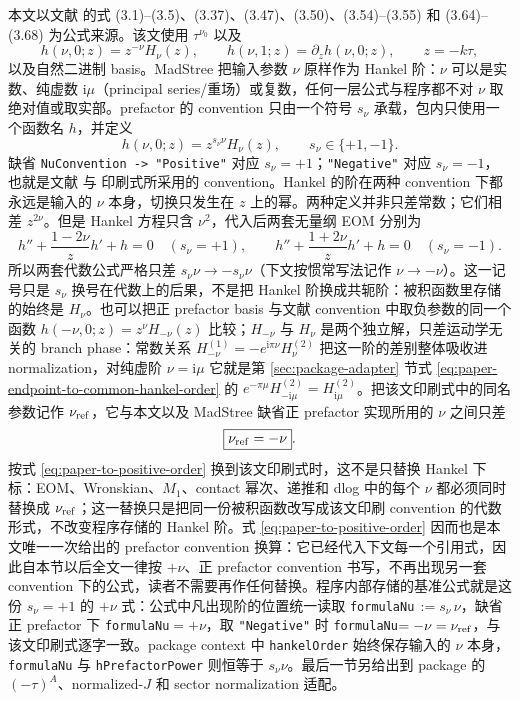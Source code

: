 \documentclass[11pt,a4paper]{ctexart}
\newcommand{\ii}{\mathrm i}
\begin{document}
本文以文献 \cite{Chen:2023eic} 的式 (3.1)--(3.5)、(3.37)、(3.47)、(3.50)、(3.54)--(3.55) 和 (3.64)--(3.68) 为公式来源。该文使用 $\tau^{\nu_0}$ 以及
\begin{equation}
 h(\nu,0;z)=z^{-\nu}H_{\nu}(z),
 \qquad
 h(\nu,1;z)=\partial_z h(\nu,0;z),
 \qquad z=-k\tau,
 \label{eq:paper-h-definition}
\end{equation}
以及自然二进制 basis。MadStree 把输入参数 $\nu$ 原样作为 Hankel 阶：$\nu$ 可以是实数、纯虚数 $\ii\mu$（principal series/重场）或复数，任何一层公式与程序都不对 $\nu$ 取绝对值或取实部。prefactor 的 convention 只由一个符号 $s_\nu$ 承载，包内只使用一个函数名 $h$，并定义
\begin{equation}
 \boxed{h(\nu,0;z)=z^{s_\nu\nu}H_\nu(z)},
 \qquad s_\nu\in\{+1,-1\}.
 \label{eq:positive-order-h}
\end{equation}
缺省 \texttt{NuConvention -> "Positive"} 对应 $s_\nu=+1$；\texttt{"Negative"} 对应 $s_\nu=-1$，也就是文献 \cite{Chen:2023eic} 与 \cite{Chen:2024jms} 印刷式所采用的 convention。Hankel 的阶在两种 convention 下都永远是输入的 $\nu$ 本身，切换只发生在 $z$ 上的幂。两种定义并非只差常数；它们相差 $z^{2\nu}$。但是 Hankel 方程只含 $\nu^2$，代入后两套无量纲 EOM 分别为
\begin{equation}
 h''+\frac{1-2\nu}{z}h'+h=0\quad(s_\nu=+1),
 \qquad
 h''+\frac{1+2\nu}{z}h'+h=0\quad(s_\nu=-1).
\end{equation}
所以两套代数公式严格只差 $s_\nu\nu\to-s_\nu\nu$（下文按惯常写法记作 $\nu\to-\nu$）。这一记号只是 $s_\nu$ 换号在代数上的后果，不是把 Hankel 阶换成共轭阶：被积函数里存储的始终是 $H_\nu$。也可以把正 prefactor basis 与文献 \cite{Chen:2023eic} convention 中取负参数的同一个函数 $h(-\nu,0;z)=z^\nu H_{-\nu}(z)$ 比较；$H_{-\nu}$ 与 $H_\nu$ 是两个独立解，只差运动学无关的 branch phase：常数关系 $H^{(1)}_{-\nu}=-e^{\ii\pi\nu}H^{(2)}_\nu$ 把这一阶的差别整体吸收进 normalization，对纯虚阶 $\nu=\ii\mu$ 它就是第 \ref{sec:package-adapter} 节式 \eqref{eq:paper-endpoint-to-common-hankel-order} 的 $e^{-\pi\mu}H^{(2)}_{-\ii\mu}=H^{(2)}_{\ii\mu}$。把该文印刷式中的同名参数记作 $\nu_{\rm ref}$，它与本文以及 MadStree 缺省正 prefactor 实现所用的 $\nu$ 之间只差
\begin{equation}
 \boxed{\nu_{\rm ref}=-\nu}.
 \label{eq:paper-to-positive-order}
\end{equation}
按式 \eqref{eq:paper-to-positive-order} 换到该文印刷式时，这不是只替换 Hankel 下标：EOM、Wronskian、$M_1$、contact 幂次、递推和 dlog 中的每个 $\nu$ 都必须同时替换成 $\nu_{\rm ref}$；这一替换只是把同一份被积函数改写成该文印刷 convention 的代数形式，不改变程序存储的 Hankel 阶。式 \eqref{eq:paper-to-positive-order} 因而也是本文唯一一次给出的 prefactor convention 换算：它已经代入下文每一个引用式，因此自本节以后全文一律按 $+\nu$、正 prefactor convention 书写，不再出现另一套 convention 下的公式，读者不需要再作任何替换。程序内部存储的基准公式就是这份 $s_\nu=+1$ 的 $+\nu$ 式：公式中凡出现阶的位置统一读取 \texttt{formulaNu}$\,:=s_\nu\,\nu$，缺省正 prefactor 下 \texttt{formulaNu}$=+\nu$，取 \texttt{"Negative"} 时 \texttt{formulaNu}$=-\nu=\nu_{\rm ref}$，与该文印刷式逐字一致。package context 中 \texttt{hankelOrder} 始终保存输入的 $\nu$ 本身，\texttt{formulaNu} 与 \texttt{hPrefactorPower} 则恒等于 $s_\nu\nu$。最后一节另给出到 package 的 $(-\tau)^A$、normalized-$J$ 和 sector normalization 适配。
\end{document}
